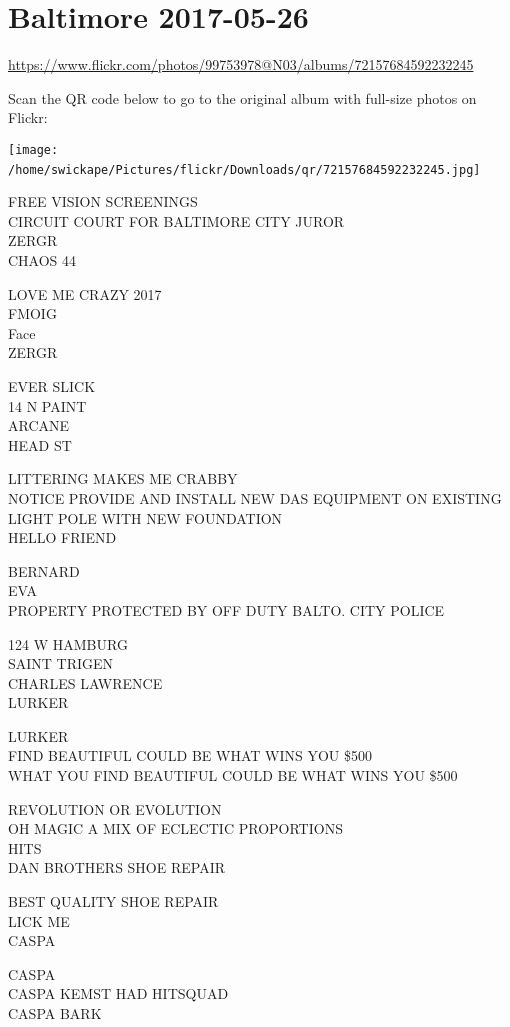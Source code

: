 \documentclass[10pt,letterpaper]{article}
\begin{document}
\section*{Baltimore 2017-05-26}

\url{https://www.flickr.com/photos/99753978@N03/albums/72157684592232245}

Scan the QR code below to go to the original album with full-size photos on Flickr:

\texttt{[image: /home/swickape/Pictures/flickr/Downloads/qr/72157684592232245.jpg]}
\

FREE VISION SCREENINGS\\
CIRCUIT COURT FOR BALTIMORE CITY JUROR\\
ZERGR\\
CHAOS 44

LOVE ME CRAZY 2017\\
FMOIG\\
Face\\
ZERGR

EVER SLICK\\
14 N PAINT\\
ARCANE\\
HEAD ST

LITTERING MAKES ME CRABBY\\
NOTICE PROVIDE AND INSTALL NEW DAS EQUIPMENT ON EXISTING LIGHT POLE WITH NEW FOUNDATION\\
HELLO FRIEND

BERNARD\\
EVA\\
PROPERTY PROTECTED BY OFF DUTY BALTO. CITY POLICE

124 W HAMBURG\\
SAINT TRIGEN\\
CHARLES LAWRENCE\\
LURKER

LURKER\\
FIND BEAUTIFUL COULD BE WHAT WINS YOU \$500\\
WHAT YOU FIND BEAUTIFUL COULD BE WHAT WINS YOU \$500

REVOLUTION OR EVOLUTION\\
OH MAGIC A MIX OF ECLECTIC PROPORTIONS\\
HITS\\
DAN BROTHERS SHOE REPAIR

BEST QUALITY SHOE REPAIR\\
LICK ME\\
CASPA

CASPA\\
CASPA KEMST HAD HITSQUAD\\
CASPA BARK
\end{document}
